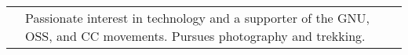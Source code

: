 %
%
%

\begin{tabular}{rl}
    \textsc{} & Passionate interest in technology and a supporter of the GNU, OSS, and CC movements. Pursues photography and trekking.\\ %
\end{tabular}